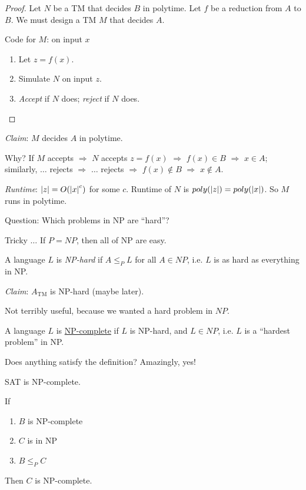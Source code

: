 \begin{proof}
    Let $N$ be a TM that decides $B$ in polytime. Let $f$ be a reduction from $A$ to $B$. We must design a TM $M$ that decides $A$.

    Code for $M$: on input $x$

    \begin{enumerate}
      \item Let $z = f(x)$.
      \item Simulate $N$ on input $z$.
      \item \emph{Accept} if $N$ does; \emph{reject} if $N$ does.
    \end{enumerate}
\end{proof}

\emph{Claim}: $M$ decides $A$ in polytime.

Why? If $M$ accepts $\Rightarrow$ $N$ accepts $z = f(x)$ $\Rightarrow$ $f(x) \in B$ $\Rightarrow$ $x \in A$; similarly, $\ldots$ rejects $\Rightarrow$ $\ldots$ rejects $\Rightarrow$ $f(x) \notin B$ $\Rightarrow$ $x \notin A$.

\emph{Runtime}: $\left | z \right | = O(\left | x \right |^c)$ for some $c$. Runtime of $N$ is $poly(\left | z \right |) = poly(\left | x \right |)$. So $M$ runs in polytime.

Question: Which problems in NP are ``hard''?

Tricky $\ldots$ If $P = NP$, then all of NP are easy.

\begin{definition}
    A language $L$ is \emph{NP-hard} if $A \leq_{P} L$ for all $A \in NP$, i.e. $L$ is as hard as everything in NP.
\end{definition}

\emph{Claim}: $A_{\text{TM}}$ is NP-hard (maybe later).

Not terribly useful, because we wanted a hard problem \emph{}{in} $NP$.

\begin{definition}
    A language $L$ is \underline{NP-complete} if $L$ is NP-hard, and $L \in NP$, i.e. $L$ is a ``hardest problem'' in NP.
\end{definition}

Does anything satisfy the definition? Amazingly, yes!

\begin{theorem}
    SAT is NP-complete.
\end{theorem}

\begin{theorem}
    If

    \begin{enumerate}
      \item $B$ is NP-complete
      \item $C$ is in NP
      \item $B \leq_{P} C$
    \end{enumerate}

    Then $C$ is NP-complete.
\end{theorem}

